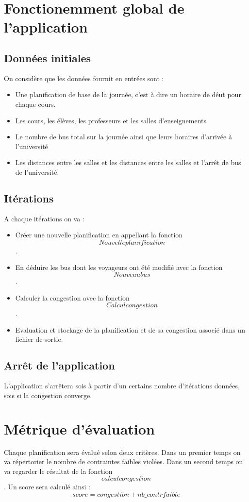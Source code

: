 \documentclass[a4paper,11pt]{article}
\begin{document}
\section{Fonctionemment global de l'application}
	\subsection{Données initiales}
		On considère que les données fournit en entrées sont : 
		\begin{itemize}
				\item Une planification de base de la journée, c'est à dire un horaire de déut pour chaque cours.
				\item Les cours, les élèves, les professeurs et les salles d'enseignements
				\item Le nombre de bus total sur la journée ainsi que leurs horaires d'arrivée à l'université
				\item Les distances entre les salles et les distances entre les salles et l'arrêt de bus de l'université.
			\end{itemize}
	\subsection{Itérations}
		A chaque itérations on va :
		\begin{itemize}
				\item Créer une nouvelle planification en appellant la fonction $$Nouvelle planification$$.
				\item En déduire les bus dont les voyageurs ont été modifié avec la fonction $$Nouveau bus$$.
				\item Calculer la congestion avec la fonction $$Calcul congestion$$.
				\item Evaluation et stockage de la planification et de sa congestion associé dans un fichier de sortie.
			\end{itemize}
	\subsection{Arrêt de l'application}
		L'application s'arrêtera sois à partir d'un certains nombre d'itérations données, sois si la congestion
		converge.		
\section{Métrique d'évaluation}
	Chaque planification sera évalué selon deux critères. Dans un premier temps on va répertorier le nombre de contraintes faibles violées.
	Dans un second temps on va regarder le résultat de la fonction $$calcul congestion$$.
	Un score sera calculé ainsi : 
	$$score  = congestion + nb\_contrfaible$$
\end{document}
